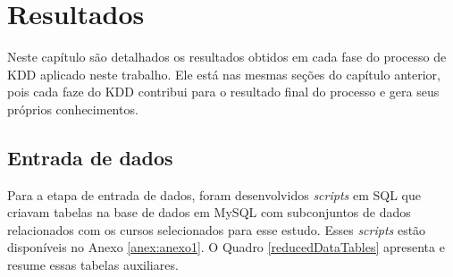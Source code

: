 \chapter{Resultados} \label{resultados}

Neste capítulo são detalhados os resultados obtidos em cada fase do processo de
KDD aplicado neste trabalho. Ele está nas mesmas seções do capítulo anterior,
pois cada faze do KDD contribui para o resultado final do processo e gera seus
próprios conhecimentos.

\section{Entrada de dados}

Para a etapa de entrada de dados, foram desenvolvidos \textit{scripts} em SQL
que criavam tabelas na base de dados em MySQL com subconjuntos de dados
relacionados com os cursos selecionados para esse estudo. Esses \textit{scripts}
estão disponíveis no Anexo \ref{anex:anexo1}. O Quadro \ref{reducedDataTables}
apresenta e resume essas tabelas auxiliares.


